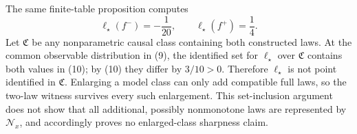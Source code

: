 The same finite-table proposition computes
\[
 \ell_\star(f^-)=-\frac1{20},
 \qquad
 \ell_\star(f^+)=\frac14.                                                                \tag{10}
\]
Let \(\mathfrak C\) be any nonparametric causal class containing both constructed laws.  At the common observable distribution in (9), the identified set for \(\ell_\star\) over \(\mathfrak C\) contains both values in (10); by (10) they differ by \(3/10>0\).  Therefore \(\ell_\star\) is not point identified in \(\mathfrak C\).  Enlarging a model class can only add compatible full laws, so the two-law witness survives every such enlargement.  This set-inclusion argument does not show that all additional, possibly nonmonotone laws are represented by \(\mathcal N_x\), and accordingly proves no enlarged-class sharpness claim.
